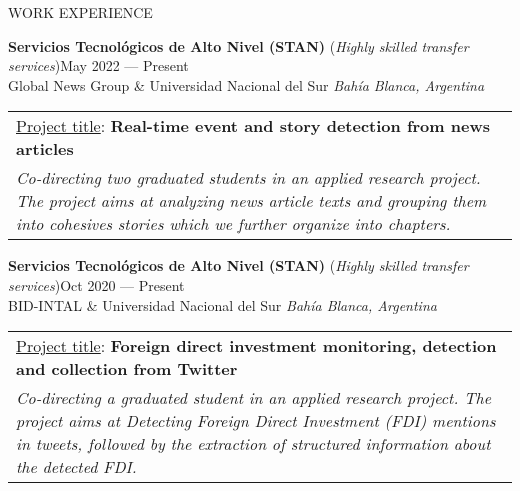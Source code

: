 \documentclass{resume} %
\begin{document}
\begin{rSection}{WORK EXPERIENCE}
\newpage

\item  \textbf{Servicios Tecnológicos de Alto Nivel (STAN)} (\textit{Highly skilled transfer services})\hfill May 2022 --- Present\\\smallskip
Global News Group \& Universidad Nacional del Sur \hfill \textit{Bahía Blanca, Argentina}\\
\begin{table}[!ht]
\vspace{-0.7cm}
    \begin{tabular}{|p{\textwidth}}
    \underline{Project title}: \textbf{Real-time event and story detection from news articles} \\
\textit{Co-directing two graduated students in an applied research project. The project aims at analyzing news article texts and grouping them into cohesives stories which we further organize into chapters.}
    \end{tabular}\vspace{-0.5cm}
\end{table}


 

\item  \textbf{Servicios Tecnológicos de Alto Nivel (STAN)} (\textit{Highly skilled transfer services})\hfill Oct 2020 --- Present\\\smallskip
BID-INTAL \& Universidad Nacional del Sur \hfill \textit{Bahía Blanca, Argentina}\\
\begin{table}[!ht]
\vspace{-0.7cm}
    \begin{tabular}{|p{\textwidth}}
\underline{Project title}: \textbf{Foreign direct investment monitoring, detection and collection from Twitter}\\
\textit{Co-directing a graduated student in an applied research project. The project aims at Detecting Foreign Direct Investment (FDI) mentions in tweets, followed by the extraction of structured information about the detected FDI. }
    \end{tabular}\vspace{-0.5cm}
\end{table}



\end{rSection}
\end{document}
